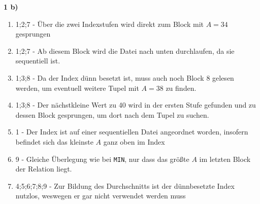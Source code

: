 \documentclass[12pt]{article}
\begin{document}
\textbf{1 b)}
\begin{enumerate}
    \item 1;2;7 - Über die zwei Indexstufen wird direkt zum Block mit $A=34$ gesprungen
    \item 1;2;7 - Ab diesem Block wird die Datei nach unten durchlaufen, da sie
        sequentiell ist.
    \item 1;3;8 - Da der Index dünn besetzt ist, muss auch noch Block 8 gelesen
        werden, um eventuell weitere Tupel mit $A=38$ zu finden.
    \item 1;3;8 - Der nächstkleine Wert zu 40 wird in der ersten Stufe gefunden
        und zu dessen Block gesprungen, um dort nach dem Tupel zu suchen.
    \item 1 - Der Index ist auf einer sequentiellen Datei angeordnet worden,
        insofern befindet sich das kleinste $A$ ganz oben im Index
    \item 9 - Gleiche Überlegung wie bei \verb=MIN=, nur dass das größte $A$
        im letzten Block der Relation liegt.
    \item 4;5;6;7;8;9 - Zur Bildung des Durchschnitts ist der dünnbesetzte Index
        nutzlos, weswegen er gar nicht verwendet werden muss
\end{enumerate}
\end{document}
